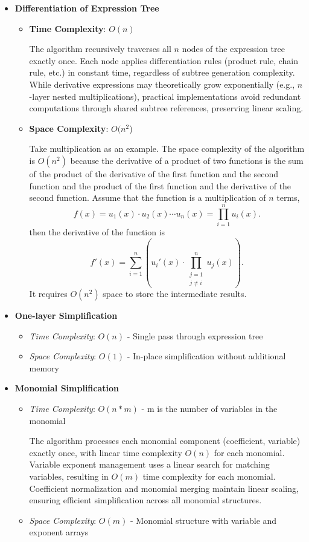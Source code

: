\documentclass{report}
\begin{document}
\begin{itemize}
    \item \textbf{Differentiation of Expression Tree}
    \begin{itemize}
        \item \textbf{Time Complexity}: \(O(n)\)
        
        The algorithm recursively traverses all \(n\) nodes of the expression tree exactly once. Each node applies differentiation rules (product rule, chain rule, etc.) in constant time, regardless of subtree generation complexity. While derivative expressions may theoretically grow exponentially (e.g., \(n\)-layer nested multiplications), practical implementations avoid redundant computations through shared subtree references, preserving linear scaling.

        \item \textbf{Space Complexity}: \(O(n^2\))
        
        Take multiplication as an example. The space complexity of the algorithm is \(O(n^2)\) because the derivative of a product of two functions is the sum of the product of the derivative of the first function and the second function and the product of the first function and the derivative of the second function. Assume that the function is a multiplication of \(n\) terms, $$ f(x) = u_1(x) \cdot u_2(x) \cdots u_n(x) = \prod_{i=1}^n u_i(x). $$
        then the derivative of the function is $$ f'(x) = \sum_{i=1}^n \left( u_i'(x) \cdot \prod_{\substack{j=1 \\ j \neq i}}^n u_j(x) \right). $$ It requires \(O(n^2)\) space to store the intermediate results.
    \end{itemize}

    \item \textbf{One-layer Simplification}
    \begin{itemize}
        \item \textit{Time Complexity}: $O(n)$ - Single pass through expression tree
        \item \textit{Space Complexity}: $O(1)$ - In-place simplification without additional memory
    \end{itemize}

    \item \textbf{Monomial Simplification}
    \begin{itemize}
        \item \textit{Time Complexity}: $O(n*m)$ - m is the number of variables in the monomial
        
        The algorithm processes each monomial component (coefficient, variable) exactly once, with linear time complexity \(O(n)\) for each monomial. Variable exponent management uses a linear search for matching variables, resulting in \(O(m)\) time complexity for each monomial. Coefficient normalization and monomial merging maintain linear scaling, ensuring efficient simplification across all monomial structures.
        \item \textit{Space Complexity}: $O(m)$ - Monomial structure with variable and exponent arrays
    \end{itemize}

\end{itemize}
\end{document}

